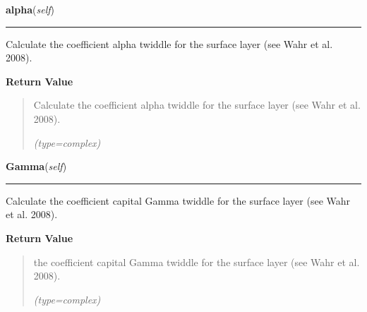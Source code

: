 \hspace{.8\funcindent}\begin{boxedminipage}{\funcwidth}

    \raggedright \textbf{alpha}(\textit{self})

    \vspace{-1.5ex}

    \rule{\textwidth}{0.5\fboxrule}
\setlength{\parskip}{2ex}
    Calculate the coefficient alpha twiddle for the surface layer (see Wahr
    et al. 2008).

\setlength{\parskip}{1ex}
      \textbf{Return Value}
    \vspace{-1ex}

      \begin{quote}
      Calculate the coefficient alpha twiddle for the surface layer (see 
      Wahr et al. 2008).

      {\it (type=complex)}

      \end{quote}

    \end{boxedminipage}

    \label{SatStress:SatStress:StressDef:Gamma}

    \vspace{0.5ex}

\hspace{.8\funcindent}\begin{boxedminipage}{\funcwidth}

    \raggedright \textbf{Gamma}(\textit{self})

    \vspace{-1.5ex}

    \rule{\textwidth}{0.5\fboxrule}
\setlength{\parskip}{2ex}
    Calculate the coefficient capital Gamma twiddle for the surface layer 
    (see Wahr et al. 2008).

\setlength{\parskip}{1ex}
      \textbf{Return Value}
    \vspace{-1ex}

      \begin{quote}
      the coefficient capital Gamma twiddle for the surface layer (see Wahr
      et al. 2008).

      {\it (type=complex)}

      \end{quote}

    \end{boxedminipage}


